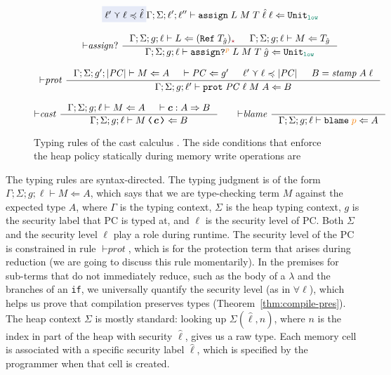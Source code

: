 \begin{figure}[tbp]
{\begin{gather*}
{               \highlightblue{\ell' \curlyvee \ell \preccurlyeq \hat{\ell}} }
              {\Gamma; \Sigma; \ell'; \ell'' \vdash \ccassign{L}{M}{T}{\hat{\ell}}{\ell} \Leftarrow \Unit_{\low}}
    \\[2ex]
    {\vdash}\mathit{assign?} ~
    \inference{\Gamma; \Sigma; g; \ell \vdash L \Leftarrow (\Refer{T_{\hat{g}}})_{\unk} &
               \Gamma; \Sigma; g; \ell \vdash M \Leftarrow T_{\hat{g}}}
              {\Gamma; \Sigma; g; \ell \vdash \ccassignproj{L}{M}{T}{\hat{g}}{p} \Leftarrow \Unit_{\low}}
    \\[2ex]
    {\vdash}\mathit{prot} ~
    \inference{\Gamma; \Sigma; g'; | \PC | \vdash M \Leftarrow A &
               \vdash \PC \Leftarrow g' &
               \ell' \curlyvee \ell \preccurlyeq | \PC | &
               B = \mathit{stamp} \; A \; \ell}
              {\Gamma; \Sigma; g; \ell' \vdash \ccprot{\PC}{\ell}{M}{A} \Leftarrow B}
    \\[2ex]
    {\vdash}\mathit{cast} ~
    \inference{\Gamma; \Sigma; g; \ell \vdash M \Leftarrow A & \vdash \bm{c} : A \Rightarrow B}
              {\Gamma; \Sigma; g; \ell \vdash \cccast{M}{\bm{c}} \Leftarrow B}
    \qquad
    {\vdash}\mathit{blame} ~
    \inference{}
              {\Gamma; \Sigma; g; \ell \vdash \blame{p} \Leftarrow A}
  \end{gather*}}
  \caption{Typing rules of the cast calculus \CC. The side conditions that enforce the
  heap policy statically during memory write operations are }
  \label{fig:cc-typing-full}
\end{figure}

The typing rules are syntax-directed.  The typing judgment is of the
form $\Gamma ; \Sigma ; g ; \ell \vdash M \Leftarrow A$, which says
that we are type-checking \CC term $M$ against the expected type $A$,
where $\Gamma$ is the typing context, $\Sigma$ is the heap typing
context, $g$ is the security label that PC is typed at, and $\ell$ is
the security level of PC.  Both $\Sigma$ and the security level $\ell$
play a role during runtime.  The security level of the PC is constrained in
rule ${\vdash}\textit{prot}$, which is for the protection term that
arises during reduction (we are going to discuss this rule momentarily).
In the premises for sub-terms that do not immediately
reduce, such as the body of a $\lambda$ and the branches of an
\texttt{if}, we universally quantify the security level (as in
$\forall \ell$), which helps us prove that
compilation preserves types (Theorem~\ref{thm:compile-pres}).  The heap
context $\Sigma$ is mostly standard: looking up
$\Sigma(\hat{\ell}, n)$, where $n$ is the index in part of the heap
with security $\hat{\ell}$, gives us a raw type. Each memory cell is
associated with a specific security label $\hat{\ell}$, which is
specified by the programmer when that cell is
created.

